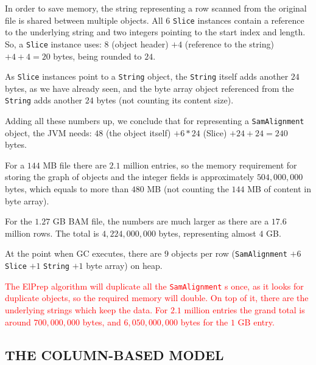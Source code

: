 \documentclass[a4paper,twoside]{article}
\begin{document}
In order to save memory, the string representing a row scanned from the original file is shared between multiple objects.
All $6$ {\texttt{Slice} } instances contain a reference to the  underlying string and two integers pointing to the start index and length.
So, a {\texttt{Slice} } instance uses: $8$ (object header) $+4$ (reference to the string) $ + 4 + 4 = 20$ bytes, being rounded to $24$.


As {\texttt{Slice} } instances point to a {\texttt{String} } object, the {\texttt{String} } itself adds another $24$ bytes, as we have already seen, and the byte array object referenced from the {\texttt{String} } adds another $24$ bytes (not counting its content size).


Adding all these numbers up, we conclude that for representing a {\texttt{SamAlignment} } object, the JVM needs: $48$ (the object itself) $+ 6*24$ (Slice) $ + 24 + 24 = 240$ bytes.

For a $144$ MB file there are $2.1$ million entries, so the memory requirement for storing the graph of objects and the integer fields is approximately $504,000,000$ bytes, which equals to more than $480$ MB (not counting the $144$ MB of content in byte array).

For the $1.27$ GB BAM file, the numbers are much larger as there are a $17.6$ million rows.
The total is $4,224,000,000$ bytes, representing almost $4$ GB\@.


At the point when GC executes, there are $9$ objects per row 
({\texttt{SamAlignment} } $+ 6$ {\texttt{Slice} } $+ 1$ {\texttt{String} } $+ 1$ byte array) on heap.

\textcolor{red}{
The ElPrep algorithm will duplicate all the {\texttt{SamAlignment} }s once, as it looks for duplicate objects, so the required memory will double.
On top of it, there are the underlying strings which keep the data.
For $2.1$ million entries the grand total is around $700,000,000$ bytes, and $6,050,000,000$ bytes for the $1$ GB entry.
}



\subsection{\uppercase{The Column-Based Model}} \label{model:column}
\end{document}
